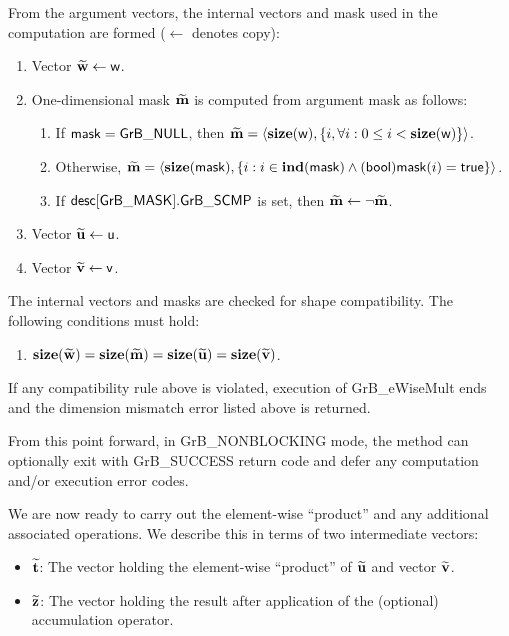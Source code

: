 From the argument vectors, the internal vectors and mask used in 
the computation are formed ($\leftarrow$ denotes copy):
\begin{enumerate}
	\item Vector ${\bf \widetilde{w}} \leftarrow {\sf w}$.

	\item One-dimensional mask ${\bf \widetilde{m}}$ is computed from 
    argument {\sf mask} as follows:
	\begin{enumerate}
		\item	If ${\sf mask} = {\sf GrB\_NULL}$, then ${\bf \widetilde{m}} = 
        \langle \bold{size}({\sf w}), \{i, \forall i : 0 \leq i < 
        \bold{size}({\sf w}) \} \rangle$.

		\item	Otherwise, ${\bf \widetilde{m}} = 
        \langle \bold{size}({\sf mask}), \{i :  i \in \bold{ind}({\sf mask}) \wedge
        ({\sf bool}){\sf mask}(i) = {\sf true} \} \rangle$.

		\item	If ${\sf desc[GrB\_MASK].GrB\_SCMP}$ is set, then ${\bf \widetilde{m}} \leftarrow \neg {\bf \widetilde{m}}$.
	\end{enumerate}

	\item Vector ${\bf \widetilde{u}} \leftarrow {\sf u}$.

	\item Vector ${\bf \widetilde{v}} \leftarrow {\sf v}$.
\end{enumerate}

The internal vectors and masks are checked for shape compatibility. The following 
conditions must hold:
\begin{enumerate}
	\item $\bold{size}({\bf \widetilde{w}}) = \bold{size}({\bf \widetilde{m}})
    = \bold{size}({\bf \widetilde{u}}) = \bold{size}({\bf \widetilde{v}})$.
\end{enumerate}
If any compatibility rule above is violated, execution of {\sf GrB\_eWiseMult} ends and 
the dimension mismatch error listed above is returned.

From this point forward, in {\sf GrB\_NONBLOCKING} mode, the method can 
optionally exit with {\sf GrB\_SUCCESS} return code and defer any computation 
and/or execution error codes.

We are now ready to carry out the element-wise ``product'' and any additional 
associated operations.  We describe this in terms of two intermediate vectors:
\begin{itemize}
	\item ${\bf \widetilde{t}}$: The vector holding the element-wise ``product'' of
    ${\bf \widetilde{u}}$ and vector ${\bf \widetilde{v}}$.
	\item ${\bf \widetilde{z}}$: The vector holding the result after 
    application of the (optional) accumulation operator.
\end{itemize}

